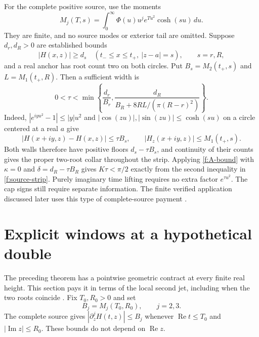 For the complete positive source, use the moments
\[
 M_j(T,s)=\int_0^\infty\Phi(u)u^j e^{Tu^2}\cosh(su)\,du.
\]
They are finite, and no source modes or exterior tail are omitted.
Suppose $d_r,d_R>0$ are established bounds
\[
 |H(x,z)|\ge d_s\quad
 (t_-\le x\le t_+,\ |z-a|=s),\qquad s=r,R,
\]
and a real anchor has root count two on both circles.  Put
$B_s=M_2(t_+,s)$ and $L=M_1(t_+,R)$.  Then a sufficient width is
\begin{equation}\label{f:source-strip}
 0<\tau<\min\left\{
    \frac{d_r}{B_r},
    \frac{d_R}{B_R+8RL/(\pi(R-r)^2)}\right\}.
\end{equation}
Indeed, $|e^{iyu^2}-1|\le|y|u^2$ and
$|\cos(zu)|,|\sin(zu)|\le\cosh(su)$ on a circle centered at a
real $a$ give
\[
 |H(x+iy,z)-H(x,z)|\le\tau B_s,\qquad
 |H_z(x+iy,z)|\le M_1(t_+,s).
\]
Both walls therefore have positive floors $d_s-\tau B_s$, and
continuity of their counts gives the proper two-root collar throughout
the strip.  Applying \eqref{f:A-bound} with $\kappa=0$ and
$\delta=d_R-\tau B_R$ gives $K\tau<\pi/2$ exactly from the second
inequality in \eqref{f:source-strip}.  Purely imaginary time lifting
requires no extra factor $e^{\tau u^2}$.  The cap signs still require
separate information.  The finite verified application discussed later
uses this type of complete-source payment \cite{note06}.

\section{Explicit windows at a hypothetical double}
\label{f:window-section}

The preceding theorem has a pointwise geometric contract at every
finite real height.  This section pays it in terms of the local
second jet, including when the two roots coincide \cite{note07}.
Fix $T_0,R_0>0$ and set
\begin{equation}\label{f:B-moments}
 B_j=M_j(T_0,R_0),\qquad j=2,3.
\end{equation}
The complete source gives
$|\partial_z^jH(t,z)|\le B_j$ whenever
$\operatorname{Re}t\le T_0$ and $|\operatorname{Im}z|\le R_0$.
These bounds do not depend on $\operatorname{Re}z$.

